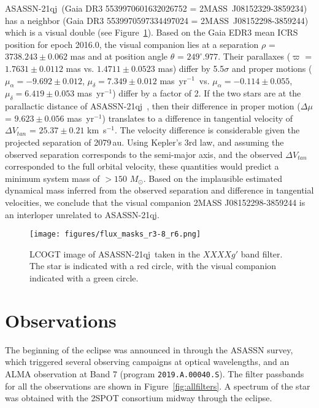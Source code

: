 \documentclass{aa}
\newcommand{\asas}{ASASSN-21qj}
\newcommand{\kms}{km~s$^{-1}$\xspace}
\newcommand{\masyr}{mas~yr$^{-1}$}
\newcommand{\msun}{$M_\odot$}
\begin{document}
\asas\ (Gaia DR3 5539970601632026752 = 2MASS~J08152329-3859234) has a neighbor (Gaia DR3 5539970597334497024 = 2MASS~J08152298-3859244) which is a visual double (see Figure~\ref{fig:asas_image}).
%
Based on the Gaia EDR3 mean ICRS position for epoch 2016.0, the visual companion lies at a separation $\rho$ = $3738.243\pm0.062$ mas and at position angle $\theta$ = $249^{\circ}.977$.
%
Their parallaxes ($\varpi$ = $1.7631\pm0.0112$ mas vs. $1.4711\pm0.0523$ mas) differ by 5.5$\sigma$ and proper motions ($\mu_{\alpha} = -9.692\pm0.012$, $\mu_{\delta} = 7.349\pm0.012$ \masyr\, vs. $\mu_{\alpha} = -0.114\pm0.055$, $\mu_{\delta} = 6.419\pm0.053$ \masyr) differ by a factor of 2.
%
If the two stars are at the parallactic distance of \asas\ \citep[$d$ = 552.4 pc;][]{BailerJones21}, then their difference in proper motion ($\Delta\mu$ = $9.623\pm0.056$ \masyr) translates to a difference in tangential velocity of $\Delta V_{tan}$ = $25.37\pm0.21$ \kms.
%
The velocity difference is considerable given the projected separation of 2079\,au.
%
Using Kepler's 3rd law, and assuming the observed separation corresponds to the semi-major axis, and the observed $\Delta V_{tan}$ corresponded to the full orbital velocity, these quantities would predict a minimum system mass of $>150$ \msun.
%
Based on the implausible estimated dynamical mass inferred from the observed separation and difference in tangential velocities, we conclude that the visual companion 2MASS J08152298-3859244 is an interloper unrelated to \asas.

\begin{figure}
\begin{centering}
\texttt{[image: figures/flux\_masks\_r3-8\_r6.png]}
\caption{LCOGT image of \asas\ taken in the $XXXXg'$ band filter. The star is indicated with a red circle, with the visual companion indicated with a green circle.
}
\label{fig:asas_image}
\end{centering}
\end{figure}



\section{Observations}\label{sec:obs}

The beginning of the eclipse was announced in \citet{RizzoSmith21} through the ASASSN survey, which triggered several observing campaigns at optical wavelengths, and an ALMA observation at Band 7 (program \texttt{2019.A.00040.S}).
%
%
The filter passbands for all the observations are shown in Figure~\ref{fig:allfilters}.
%
A spectrum of the star was obtained with the 2SPOT consortium midway through the eclipse.
\end{document}

